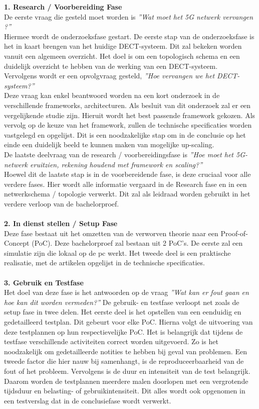 \textbf{1. Research / Voorbereiding Fase}\\
De eerste vraag die gesteld moet worden is \textit{''Wat moet het 5G netwerk vervangen ?''} \\
Hiermee wordt de onderzoeksfase gestart. De eerste stap van de onderzoeksfase is het in kaart brengen van het huidige DECT-systeem. Dit zal bekeken worden vanuit een algemeen overzicht. Het doel is om een topologisch schema en een duidelijk overzicht te hebben van de werking van een DECT-systeem.\\
Vervolgens wordt er een opvolgvraag gesteld, \textit{''Hoe vervangen we het DECT-systeem?''}\\ Deze vraag kan enkel beantwoord worden na een kort onderzoek in de verschillende frameworks, architecturen. Als besluit van dit onderzoek zal er een vergelijkende studie zijn. Hieruit wordt het best passende framework gekozen.
Als vervolg op de keuze van het framework, zullen de technische specificaties worden vastgelegd en opgelijst. Dit is een noodzakelijke stap om in de conclusie op het einde een duidelijk beeld te kunnen maken van mogelijke up-scaling.\\
De laatste deelvraag van de research / voorbereidingsfase is \textit{''Hoe moet het 5G-netwerk eruitzien, rekening houdend met framework en scaling?''}\\ Hoewel dit de laatste stap is in de voorbereidende fase, is deze cruciaal voor alle verdere fases. Hier wordt alle informatie vergaard in de Research fase en in een netwerkschema / topologie verwerkt. Dit zal als leidraad worden gebruikt in het verdere verloop van de bachelorproef.\\\\
\textbf{2. In dienst stellen / Setup Fase}\\
Deze fase bestaat uit het omzetten van de verworven theorie naar een Proof-of-Concept (PoC). Deze bachelorproef zal bestaan uit 2 PoC's. De eerste zal een simulatie zijn die lokaal op de pc werkt. Het tweede deel is een praktische realisatie, met de artikelen opgelijst in de technische specificaties. \\\\
\textbf{3. Gebruik en Testfase}\\
Het doel van deze fase is het antwoorden op de vraag \textit{''Wat kan er fout gaan en hoe kan dit worden vermeden?''} De gebruik- en testfase verloopt net zoals de setup fase in twee delen. Het eerste deel is het opstellen van een eenduidig en gedetailleerd testplan. Dit gebeurt voor elke PoC. Hierna volgt de uitvoering van deze testplannen op hun respectievelijke PoC. Het is belangrijk dat tijdens de testfase verschillende activiteiten correct worden uitgevoerd. Zo is het noodzakelijk om gedetailleerde notities te hebben bij geval van problemen. Een tweede factor die hier nauw bij samenhangt, is de reproduceerbaarheid van de fout of het probleem. Vervolgens is de duur en intensiteit van de test belangrijk. Daarom worden de testplannen meerdere malen doorlopen met een vergrotende tijdsduur en belasting- of gebruikintensiteit. Dit alles wordt ook opgenomen in een testverslag dat in de conclusiefase wordt verwerkt.\\\\
